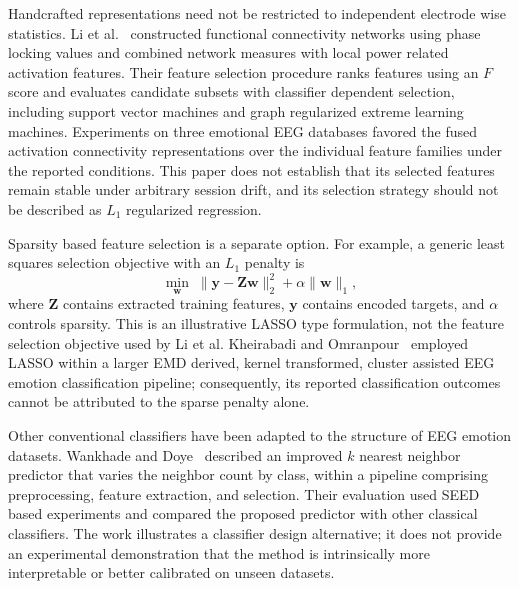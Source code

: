 \documentclass[ASNA,twocolumn]{USG}
\begin{document}
Handcrafted representations need not be restricted to independent electrode wise statistics. Li et al.~\cite{li2019eeg} constructed functional connectivity networks using phase locking values and combined network measures with local power related activation features. Their feature selection procedure ranks features using an $F$ score and evaluates candidate subsets with classifier dependent selection, including support vector machines and graph regularized extreme learning machines. Experiments on three emotional EEG databases favored the fused activation connectivity representations over the individual feature families under the reported conditions. This paper does not establish that its selected features remain stable under arbitrary session drift, and its selection strategy should not be described as $L_1$ regularized regression.

Sparsity based feature selection is a separate option. For example, a generic least squares selection objective with an $L_1$ penalty is
\begin{equation}
\min_{\mathbf{w}}\;\lVert\mathbf{y}-\mathbf{Z}\mathbf{w}\rVert_2^2
+\alpha\lVert\mathbf{w}\rVert_1,
\label{eq:eeg_generic_sparse_selection}
\end{equation}
where $\mathbf{Z}$ contains extracted training features, $\mathbf{y}$ contains encoded targets, and $\alpha$ controls sparsity. This is an illustrative LASSO type formulation, not the feature selection objective used by Li et al. Kheirabadi and Omranpour~\cite{kheirabadi2024learning} employed LASSO within a larger EMD derived, kernel transformed, cluster assisted EEG emotion classification pipeline; consequently, its reported classification outcomes cannot be attributed to the sparse penalty alone.

Other conventional classifiers have been adapted to the structure of EEG emotion datasets. Wankhade and Doye~\cite{wankhade2019ikkn} described an improved $k$ nearest neighbor predictor that varies the neighbor count by class, within a pipeline comprising preprocessing, feature extraction, and selection. Their evaluation used SEED based experiments and compared the proposed predictor with other classical classifiers. The work illustrates a classifier design alternative; it does not provide an experimental demonstration that the method is intrinsically more interpretable or better calibrated on unseen datasets.
\end{document}
